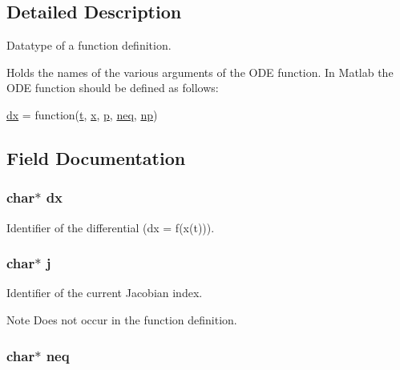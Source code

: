 \subsection{Detailed Description}
Datatype of a function definition. 

Holds the names of the various arguments of the O\-D\-E function. In Matlab the O\-D\-E function should be defined as follows\-: 
\begin{DoxyCode}
\hyperlink{structFunction_aa66668aed9b94cfd43d1d5fcad8e923d}{dx} = \textcolor{keyword}{function}(\hyperlink{structFunction_a21feba301403a65090791a94f26c9d92}{t}, \hyperlink{structFunction_a87d9da60be62fb1a74b56404c392bf74}{x}, \hyperlink{structFunction_aaa1ebe818ec1c763a776cc580551f3e6}{p}, \hyperlink{structFunction_a26607bec2385a751e572c5aa9976262d}{neq}, \hyperlink{structFunction_ac5e9e8f42513fbf549dcde4107b633d0}{np})
\end{DoxyCode}
 

\subsection{Field Documentation}
\hypertarget{structFunction_aa66668aed9b94cfd43d1d5fcad8e923d}{
\subsubsection[{dx}]{\setlength{\rightskip}{0pt plus 5cm}char$\ast$ dx}}\label{structFunction_aa66668aed9b94cfd43d1d5fcad8e923d}


Identifier of the differential (dx = f(x(t))). 

\hypertarget{structFunction_aabe3f0c55a8ab8de92abb1da25c055db}{
\subsubsection[{j}]{\setlength{\rightskip}{0pt plus 5cm}char$\ast$ j}}\label{structFunction_aabe3f0c55a8ab8de92abb1da25c055db}


Identifier of the current Jacobian index. 

\begin{DoxyNote}{Note}
Does not occur in the function definition. 
\end{DoxyNote}
\hypertarget{structFunction_a26607bec2385a751e572c5aa9976262d}{
\subsubsection[{neq}]{\setlength{\rightskip}{0pt plus 5cm}char$\ast$ neq}}\label{structFunction_a26607bec2385a751e572c5aa9976262d}


